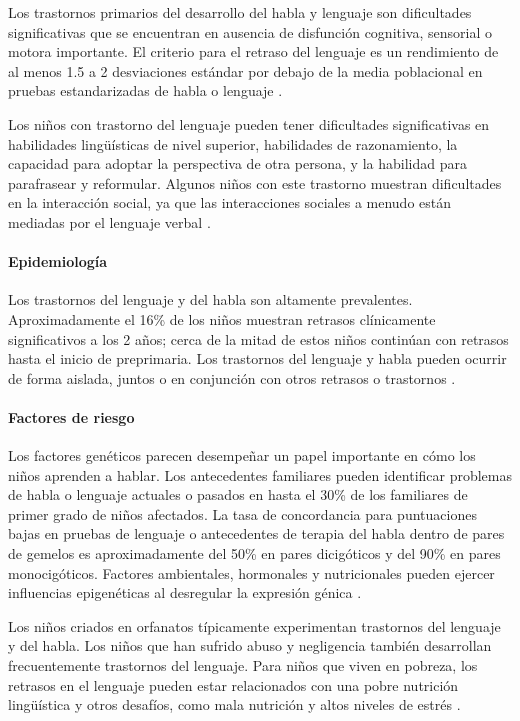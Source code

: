 Los trastornos primarios del desarrollo del habla y lenguaje son dificultades
significativas que se encuentran en ausencia de disfunción cognitiva, sensorial
o motora importante. El criterio para el retraso del lenguaje es un rendimiento
de al menos 1.5 a 2 desviaciones estándar por debajo de la media poblacional en
pruebas estandarizadas de habla o lenguaje \cite{Feldman44}.

Los niños con trastorno del lenguaje pueden tener dificultades significativas
en habilidades lingüísticas de nivel superior, habilidades de razonamiento, la
capacidad para adoptar la perspectiva de otra persona, y la habilidad para
parafrasear y reformular. Algunos niños con este trastorno muestran dificultades
en la interacción social, ya que las interacciones sociales a menudo están
mediadas por el lenguaje verbal \cite{Nelson53}.

\paragraph{Epidemiología}
Los trastornos del lenguaje y del habla son altamente prevalentes.
Aproximadamente el 16\% de los niños muestran retrasos clínicamente
significativos a los 2 años; cerca de la mitad de estos niños continúan con
retrasos hasta el inicio de preprimaria. Los trastornos del lenguaje y habla
pueden ocurrir de forma aislada, juntos o en conjunción con otros retrasos o
trastornos \cite{Feldman44}.

\paragraph{Factores de riesgo}
Los factores genéticos parecen desempeñar un papel importante en cómo los niños
aprenden a hablar. Los antecedentes familiares pueden identificar problemas de
habla o lenguaje actuales o pasados en hasta el 30\% de los familiares de primer
grado de niños afectados. La tasa de concordancia para puntuaciones bajas en
pruebas de lenguaje o antecedentes de terapia del habla dentro de pares de
gemelos es aproximadamente del 50\% en pares dicigóticos y del 90\% en pares
monocigóticos. Factores ambientales, hormonales y nutricionales pueden ejercer
influencias epigenéticas al desregular la expresión génica \cite{Nelson53}.

Los niños criados en orfanatos típicamente experimentan trastornos del lenguaje
y del habla. Los niños que han sufrido abuso y negligencia también desarrollan
frecuentemente trastornos del lenguaje. Para niños que viven en pobreza, los
retrasos en el lenguaje pueden estar relacionados con una pobre nutrición
lingüística y otros desafíos, como mala nutrición y altos niveles de estrés
\cite{Feldman44}.

